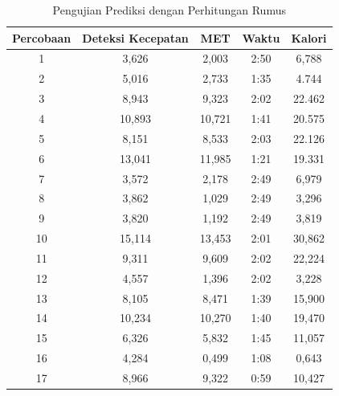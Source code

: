 \begin{longtable}{|c|c|c|c|c|}
  \caption{Pengujian Prediksi dengan Perhitungan Rumus}
  \label{tb:PengujianPrediksiPerhitungan}                                   \\
  \hline
  \rowcolor[HTML]{C0C0C0}
  \textbf{Percobaan} & \textbf{Deteksi Kecepatan} & \textbf{MET} & \textbf{Waktu} & \textbf{Kalori} \\
  \hline
  1   & 3,626   & 2,003    & 2:50    & 6,788   \\
  \hline
  2   & 5,016   & 2,733    & 1:35    & 4.744   \\
  \hline
  3   & 8,943   & 9,323    & 2:02    & 22.462  \\
  \hline
  4   & 10,893  & 10,721   & 1:41    & 20.575  \\
  \hline
  5   & 8,151   & 8,533    & 2:03    & 22.126  \\
  \hline
  6   & 13,041  & 11,985   & 1:21    & 19.331  \\
  \hline
  7   & 3,572   & 2,178    & 2:49    & 6,979  \\
  \hline
  8   & 3,862   & 1,029    & 2:49    & 3,296  \\
  \hline
  9   & 3,820   & 1,192    & 2:49    & 3,819  \\
  \hline
  10   & 15,114   & 13,453   & 2:01    & 30,862  \\
  \hline
  11   & 9,311   & 9,609   & 2:02    & 22,224  \\
  \hline
  12   & 4,557   & 1,396   & 2:02    & 3,228  \\
  \hline
  13   & 8,105   & 8,471   & 1:39    & 15,900  \\
  \hline
  14   & 10,234   & 10,270   & 1:40    & 19,470  \\
  \hline
  15   & 6,326   & 5,832   & 1:45    & 11,057  \\
  \hline
  16   & 4,284   & 0,499    & 1:08    & 0,643  \\
  \hline
  17   & 8,966   & 9,322   & 0:59    & 10,427  \\
  \hline
\end{longtable}

